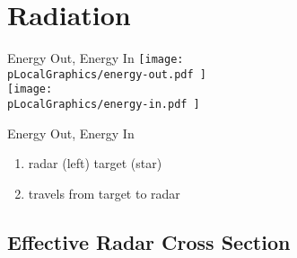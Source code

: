 % 

\section{Radiation}

\begin{frame}{Energy Out, Energy In}
    \centering
    \texttt{[image:  \\pLocalGraphics/energy-out.pdf ]} \\[1em]
    \texttt{[image:  \\pLocalGraphics/energy-in.pdf ]} \\[1em]
\end{frame}

\begin{frame}{Energy Out, Energy In}
    	\begin{enumerate}
		\item radar (left) {\color{red}{irradiates}} target (star)
		\item {\color{blue}{backscatter}} travels from target to radar
	\end{enumerate}
\end{frame}


\subsection{Effective Radar Cross Section}

